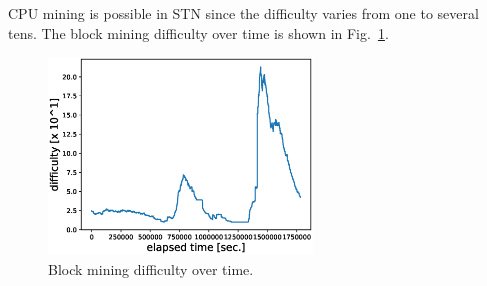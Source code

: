 \documentclass[graybox]{svmult}
\begin{document}
CPU mining is possible in STN since the difficulty varies from one to several tens.
The block mining difficulty over time is shown in Fig.~\ref{fig:difficulty}.
%
\begin{figure}[t]
  \vspace{-35mm}
  \begin{center}
    \includegraphics[width=70mm]{time_vs_difficulty-plot.eps}
  \end{center}
  \vspace{35mm}
  \caption{Block mining difficulty over time.}
  \label{fig:difficulty}
\end{figure}
%
\end{document}
